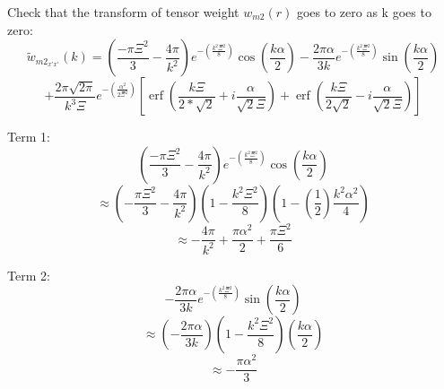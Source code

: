 \documentclass[double,12pt]{beavtex}
\begin{document}
\noindent Check that the transform of tensor weight ${w}_{m2}(r)$ goes to zero as k goes to zero:
\begin{displaymath}{\widetilde{w}_{{m2}_{x'x'}}(k)=\left(\frac{-\pi\Xi^2}{3}-\frac{4\pi}{k^2}\right)e^{-\left(\frac{k^2\Xi^2}{8}\right)}\cos(\frac{k\alpha}{2})-\frac{2\pi\alpha}{3k}e^{-\left(\frac{k^2\Xi^2}{8}\right)}\sin(\frac{k\alpha}{2})}\end{displaymath} 
\begin{equation}{+\frac{2\pi\sqrt{2\pi}}{k^3\Xi}e^{-\left(\frac{\alpha^2}{2\Xi^2}\right)}\left[\operatorname{erf}\left(\frac{k\Xi}{2*\sqrt{2}}+i\frac{\alpha}{\sqrt{2}\Xi}\right)+\operatorname{erf}\left(\frac{k\Xi}{2\sqrt{2}}-i\frac{\alpha}{\sqrt{2}\Xi}\right)\right]}\end{equation}

Term 1: 
\begin{equation}{\left(\frac{-\pi\Xi^2}{3}-\frac{4\pi}{k^2}\right)e^{-\left(\frac{k^2\Xi^2}{8}\right)}\cos(\frac{k\alpha}{2})}\end{equation}
\begin{displaymath}{\approx\left(-\frac{\pi\Xi^2}{3}-\frac{4\pi}{k^2}\right)\left(1-\frac{k^2\Xi^2}{8}\right)\left(1-\left(\frac{1}{2}\right)\frac{k^2\alpha^2}{4}\right)}\end{displaymath} 
\begin{displaymath}{\approx-\frac{4\pi}{k^2}+\frac{\pi\alpha^2}{2}+\frac{\pi\Xi^2}{6}}\end{displaymath} 

Term 2:
\begin{equation}{-\frac{2\pi\alpha}{3k}e^{-\left(\frac{k^2\Xi^2}{8}\right)}\sin(\frac{k\alpha}{2})}\end{equation} 
\begin{displaymath}{\approx\left(-\frac{2\pi\alpha}{3k}\right)\left(1-\frac{k^2\Xi^2}{8}\right)\left(\frac{k\alpha}{2}\right)}\end{displaymath} 
\begin{displaymath}{\approx}-\frac{\pi\alpha^2}{3}\end{displaymath}
 
\end{document}
